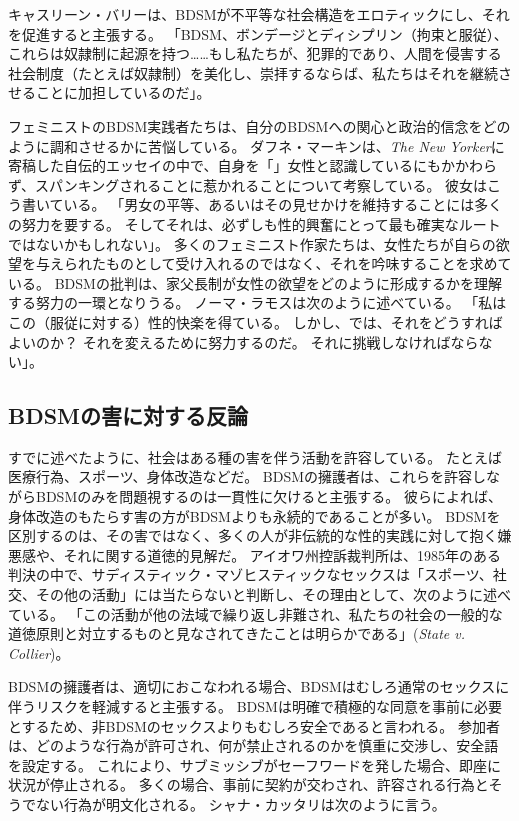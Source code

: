 \documentclass[paper=a4,book,openany]{jlreq}
\newcommand{\ig}[1]{}           %
\begin{document}
キャスリーン・バリー\ig{Barry}は、BDSMが不平等な社会構造をエロティックにし、それを促進すると主張する。
「BDSM、ボンデージとディシプリン（拘束と服従）、これらは奴隷制に起源を持つ……もし私たちが、犯罪的であり、人間を侵害する社会制度（たとえば奴隷制）を美化し、崇拝するならば、私たちはそれを継続させることに加担しているのだ」\citep{murphy12:_part_two_two_part_series_bdsm_femin}。
\ig{Meghan Murphy}

フェミニストのBDSM実践者たちは、自分のBDSMへの関心と政治的信念をどのように調和させるかに苦悩している。
ダフネ・マーキンは、\emph{The New Yorker}に寄稿した自伝的エッセイの中で、自身を「」女性と認識しているにもかかわらず、スパンキングされることに惹かれることについて考察している。
彼女はこう書いている。
「男女の平等、あるいはその見せかけを維持することには多くの努力を要する。
そしてそれは、必ずしも性的興奮にとって最も確実なルートではないかもしれない」\citep{merkin96:_unlik_obses}。
多くのフェミニスト作家たちは、女性たちが自らの欲望を与えられたものとして受け入れるのではなく、それを吟味することを求めている。
BDSMの批判は、家父長制が女性の欲望をどのように形成するかを理解する努力の一環となりうる。
ノーマ・ラモスは次のように述べている。
「私はこの（服従に対する）性的快楽を得ている。
しかし、では、それをどうすればよいのか？ それを変えるために努力するのだ。
それに挑戦しなければならない」\citep[p.62]{gillespie95:_where_do_we_stand_pornog}。

\subsection{BDSMの害に対する反論}

すでに述べたように、社会はある種の害を伴う活動を許容している。
たとえば医療行為、スポーツ、身体改造などだ。
BDSMの擁護者は、これらを許容しながらBDSMのみを問題視するのは一貫性に欠けると主張する。
彼らによれば、身体改造のもたらす害の方がBDSMよりも永続的であることが多い。
BDSMを区別するのは、その害ではなく、多くの人が非伝統的な性的実践に対して抱く嫌悪感や、それに関する道徳的見解だ。
アイオワ州控訴裁判所は、1985年のある判決の中で、サディスティック・マゾヒスティックなセックスは「スポーツ、社交、その他の活動」には当たらないと判断し、その理由として、次のように述べている。
「この活動が他の法域で繰り返し非難され、私たちの社会の一般的な道徳原則と対立するものと見なされてきたことは明らかである」(\emph{State v. Collier})。

BDSMの擁護者は、適切におこなわれる場合、BDSMはむしろ通常のセックスに伴うリスクを軽減すると主張する。
BDSMは明確で積極的な同意を事前に必要とするため、非BDSMのセックスよりもむしろ安全であると言われる。
参加者は、どのような行為が許可され、何が禁止されるのかを慎重に交渉し、安全語を設定する。
これにより、サブミッシブがセーフワードを発した場合、即座に状況が停止される。
多くの場合、事前に契約が交わされ、許容される行為とそうでない行為が明文化される。
シャナ・カッタリは次のように言う。
\end{document}
